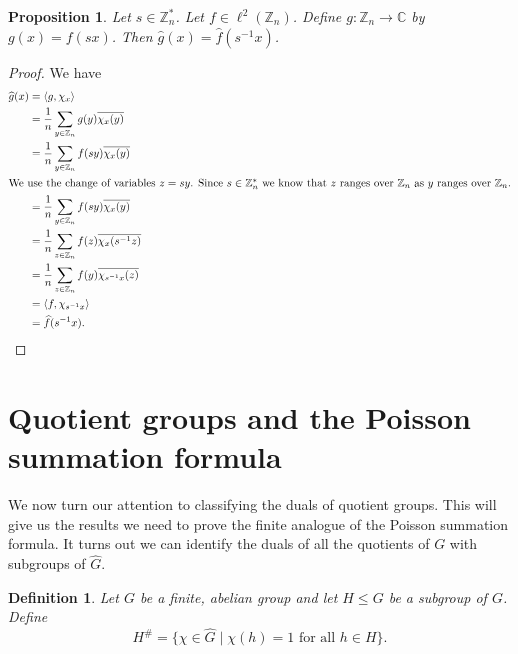 \documentclass[12pt]{article}
\newtheorem{Definition}{Definition}
\newtheorem{Proposition}{Proposition}
\newcommand{\Z}{\mathbb{Z}}
\newcommand{\C}{\mathbb{C}}
\begin{document}
\begin{Proposition} \label{scaling} %
    Let $s\in \Z_n^*$. Let $f\in \ell^2(\Z_n)$. Define $g:\Z_n\to \C$ by $g(x) = f(sx)$. Then $\widehat{g}(x) = \widehat{f}(s^{-1}x)$.
\end{Proposition}
\begin{proof}
    We have
    \begin{align*}
        \widehat{g}(x) & = \langle g, \chi_x\rangle                                      \\
                       & = \frac{1}{n}\sum_{y\in  \Z_n} g(y)\overline{\chi_x(y)}         \\
                       & =\frac{1}{n}\sum_{y\in  \Z_n} f(sy)\overline{\chi_x(y)}         \\
        \intertext{We use the change of variables $z=sy$. Since $s\in \Z_n^*$ we know that $z$ ranges over $\Z_n$ as $y$ ranges over $\Z_n$.}
                       & =\frac{1}{n}\sum_{y\in  \Z_n} f(sy)\overline{\chi_x(y)}         \\
                       & = \frac{1}{n}\sum_{z\in  \Z_n} f(z)\overline{\chi_x(s^{-1}z)}   \\
                       & = \frac{1}{n}\sum_{z\in  \Z_n} f(y)\overline{\chi_{s^{-1}x}(z)} \\
                       & = \langle f, \chi_{s^{-1}x}\rangle                              \\
                       & = \widehat{f}(s^{-1}x).
    \end{align*}

\end{proof}

\section[Quotient groups]{Quotient groups and the Poisson summation formula}


We now turn our attention to classifying the duals of quotient groups. This will give us the results we need to prove the finite analogue of the Poisson summation formula.  It turns out we can identify the duals of all the quotients of $G$ with subgroups of $\widehat{G}$.

\begin{Definition} %
    Let $G$ be a finite, abelian group and let $H\leq G$ be a subgroup of $G$. Define
    $$H^\# =\{\chi\in \widehat{G}\mid \chi(h)=1\text{ for all }h\in H\}.$$
\end{Definition}
\end{document}
